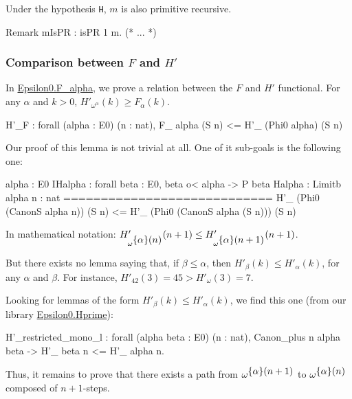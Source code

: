Under the hypothesis \texttt{H}, $m$ is also primitive recursive.

\begin{Coqsrc}
Remark mIsPR : isPR 1 m.
(* ... *)
\end{Coqsrc}


\subsubsection{Comparison between $F$ and $H'$}

In \href{../theories/html/hydras.Epsilon0.F_alpha.html}{Epsilon0.F\_alpha}, we prove a relation between the $F$ and $H'$ functional. For any $\alpha$ and $k>0$,
$H'_{\omega^\alpha}(k)\geq F_\alpha(k)$.

\begin{Coqsrc}
H'_F : forall (alpha : E0) (n : nat), 
     F_ alpha (S n) <= H'_ (Phi0 alpha) (S n) 
\end{Coqsrc}


Our proof of this lemma is not trivial at all. One of it sub-goals is the following one:

\begin{Coqsrc}
  alpha : E0
  IHalpha : forall beta : E0, beta o< alpha -> P beta
  Halpha : Limitb alpha
  n : nat
  ============================
  H'_ (Phi0 (CanonS alpha n)) (S n) <= 
  H'_ (Phi0 (CanonS alpha (S n))) (S n)
\end{Coqsrc}

In mathematical notation: $H'_{\omega^{\mbox{$\{\alpha\}(n)$}}}(n+1) \leq
H'_{\omega^{\mbox{$\{\alpha\}(n+1)$}}}(n+1)$.

\vspace{4pt}

But there exists no lemma saying that, if 
$\beta\leq \alpha$, then $H'_\beta(k)\leq H'_\alpha(k)$, for any $\alpha$ and $\beta$. For instance, 
$H'_{42}(3)=45> H'_\omega(3)=7$.


Looking for lemmas of the form $H'_\beta(k)\leq H'_\alpha(k)$, we find this one (from our library
\href{../theories/html/hydras.Epsilon0.Hprime.html}{Epsilon0.Hprime}):

\begin{Coqanswer}
H'_restricted_mono_l : 
    forall (alpha beta : E0) (n : nat), 
      Canon_plus n alpha beta -> 
      H'_ beta n <= H'_ alpha n.
\end{Coqanswer}

Thus, it remains to prove that 
there exists a path from ${\omega^{\mbox{$\{\alpha\}(n+1)$}}}$
to ${\omega^{\mbox{$\{\alpha\}(n)$}}}$ composed of 
$n+1$-steps.

